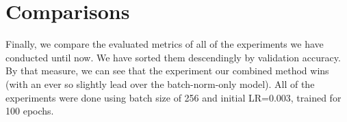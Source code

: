 \documentclass[12pt]{article}
\begin{document}
		\section{Comparisons}
		Finally, we compare the evaluated metrics of all of the experiments we have conducted until now. We have sorted them descendingly by validation accuracy. By that measure, we can see that the experiment our combined method wins (with an ever so slightly lead over the batch-norm-only model). All of the experiments were done using batch size of 256 and initial LR=0.003, trained for 100 epochs.
		
	
	
\end{document}
